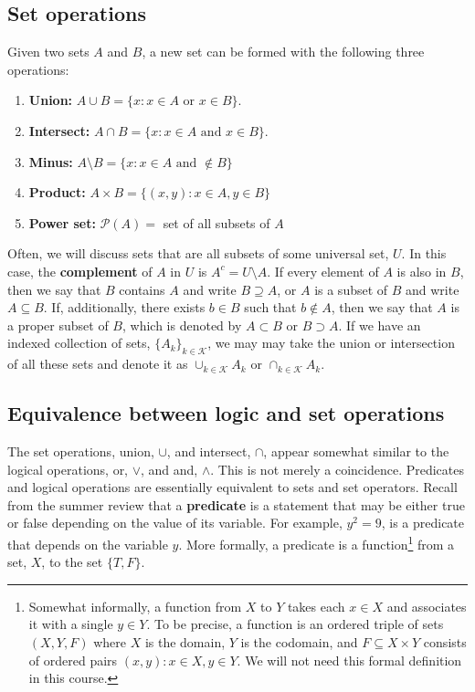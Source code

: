 \documentclass[12pt,reqno]{amsart}
\theoremstyle{definition}
\begin{document}
\subsection{Set operations}

Given two sets $A$ and $B$, a new set can be formed with the following
three operations:
\begin{enumerate}
\item \textbf{Union:} $A \cup B = \{x: x\in A \text{ or } x \in B\}$.
\item \textbf{Intersect:} $A \cap B = \{x: x \in A \text{ and } x \in
  B\}$. 
\item \textbf{Minus:} $A \setminus B = \{ x: x\in A \text{ and }
  \not\in B \}$
\item \textbf{Product:} $A \times B = \{(x,y): x \in A, y \in B \}$
\item \textbf{Power set:} $\mathcal{P}(A) =$ set of all subsets of $A$ 
\end{enumerate}
Often, we will discuss sets that are all subsets of some universal
set, $U$. In this case, the \textbf{complement} of $A$ in $U$ is $A^c
= U \setminus A$. If every element of $A$ is also in $B$, then we say that
$B$ contains $A$ and write $B \supseteq A$, or $A$ is a subset of $B$
and write $A \subseteq B$. If, additionally, there exists $b \in B$
such that $b \not\in A$, then we say that $A$ is a proper subset of $B$,
which is denoted by $A \subset B$ or $B \supset A$. If we have an
indexed collection of sets, $\{A_k \}_{k \in \mathcal{K}}$, we may
may take the union or intersection of all these sets and denote it as
$\cup_{k \in \mathcal{K}} A_k $ or $\cap_{k \in \mathcal{K}} A_k$. 

\subsection{Equivalence between logic and set
  operations \label{s:setLogic}} 
The set operations, union, $\cup$, and intersect, $\cap$, appear
somewhat similar to the logical operations, or, $\vee$, and and,
$\wedge$. This is not merely a coincidence. Predicates and logical
operations are essentially equivalent to sets and set
operators. Recall from the summer review that a \textbf{predicate} is
a statement that may be either true or false depending on the value of
its variable. For example, $y^2 = 9$, is a predicate that depends on
the variable $y$. More formally, a predicate is a
function\footnote{Somewhat informally, a function from $X$ to $Y$
  takes each $x \in X$ and associates it with a single $y \in Y$. To
  be precise, a function is an ordered triple of sets $(X,Y,F)$ where
  $X$ is the domain, $Y$ is the codomain, and $F \subseteq X \times Y$
  consists of ordered pairs $(x,y): x\in X, y \in Y$. We will not need
  this formal definition in this course. }
from a set, $X$, to the set $\{T, F \}$.  
\end{document}
